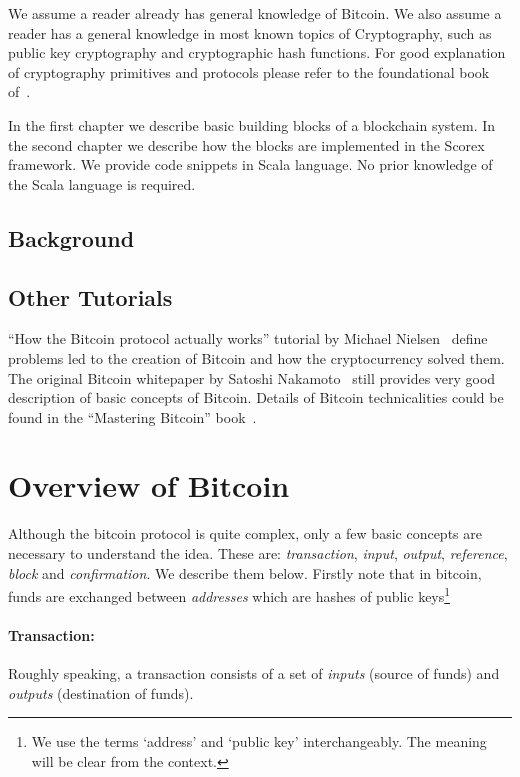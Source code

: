 \documentclass[]{report}   %
\begin{document}
We assume a reader already has general knowledge of Bitcoin. We also assume a reader has a general knowledge in most known topics of Cryptography, such as public key cryptography and cryptographic hash functions. For good explanation of cryptography primitives and protocols please refer to the foundational book of~\cite{katz2014introduction}. 

In the first chapter we describe basic building blocks of a blockchain system. In the second chapter we describe how the blocks are implemented in the Scorex framework. We provide code snippets in Scala language. No prior knowledge of the Scala language is required.

\section{Background}

\section{Other Tutorials}

``How the Bitcoin protocol actually works'' tutorial by Michael Nielsen~\cite{nielsen} define problems led to the creation of Bitcoin and how the cryptocurrency solved them. The original Bitcoin whitepaper by Satoshi Nakamoto~\cite{Nakamoto2008} still provides very good description of basic concepts of Bitcoin. Details of Bitcoin technicalities could be found in the ``Mastering Bitcoin'' book~\cite{antonopoulos2014mastering}.


\chapter{Overview of Bitcoin}

Although the bitcoin protocol is quite complex, only a few basic concepts are necessary to understand the idea. These are: {\em transaction}, {\em input}, {\em output}, {\em reference}, {\em block} and {\em confirmation}. We describe them below. Firstly note that in bitcoin, funds are exchanged between {\em addresses} which are %
hashes of public keys\footnote{We use the terms `address' and `public key' interchangeably. The meaning will be clear from the context.} %


 
\subsubsection{Transaction:} Roughly speaking, a transaction consists of a set of \emph{inputs} (source of funds) and \emph{outputs} (destination of funds). %
\end{document}
